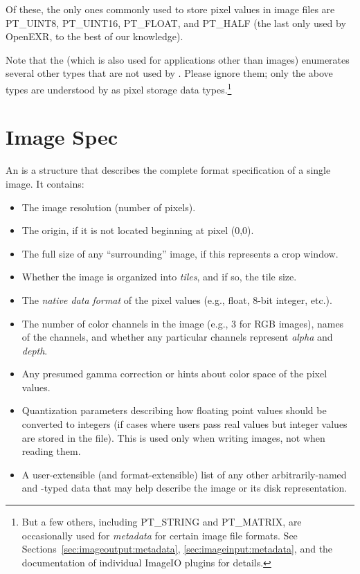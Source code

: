 Of these, the only ones commonly used to store pixel values in image files
are {\cf PT_UINT8}, {\cf PT_UINT16}, {\cf PT_FLOAT}, and {\cf PT_HALF}
(the last only used by OpenEXR, to the best of our knowledge).

Note that the \ParamBaseType (which is also used for applications other
than images) enumerates several other types that are not used by
\product.  Please ignore them; only the above types are understood by
\product as pixel storage data types.\footnote{But a few others, including
{\cf PT_STRING} and {\cf PT_MATRIX}, are occasionally used for
\emph{metadata} for certain image file formats. See
Sections~\ref{sec:imageoutput:metadata}, \ref{sec:imageinput:metadata},
and the documentation of individual ImageIO plugins for details.}

\section{Image Spec}

An \ImageSpec is a structure that describes the complete
format specification of a single image.  It contains:

\begin{itemize}
\item The image resolution (number of pixels).
\item The origin, if it is not located beginning at pixel (0,0).
\item The full size of any ``surrounding'' image, if this represents a crop
  window.
\item Whether the image is organized into \emph{tiles}, and if so, the
  tile size.
\item The \emph{native data format} of the pixel values (e.g., float, 8-bit
  integer, etc.).
\item The number of color channels in the image (e.g., 3 for RGB
  images), names of the channels, and whether any particular channels
  represent \emph{alpha} and \emph{depth}.
\item Any presumed gamma correction or hints about color space of
  the pixel values.
\item Quantization parameters describing how floating point values
  should be converted to integers (if cases where users pass real values
  but integer values are stored in the file).  This is used only when
  writing images, not when reading them.
\item A user-extensible (and format-extensible) list of any other
  arbitrarily-named and -typed data that may help describe the image or
  its disk representation.
\end{itemize}

